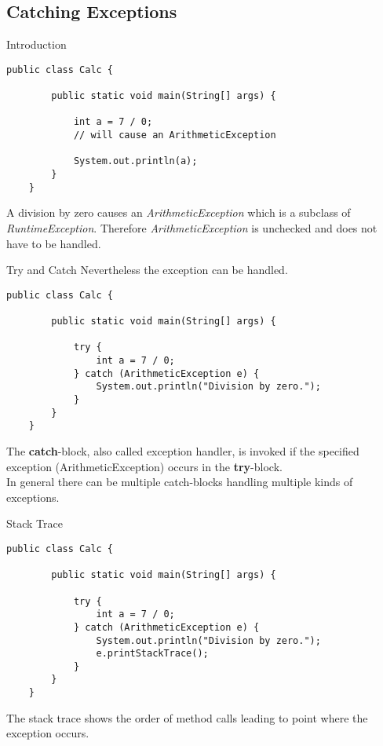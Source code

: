 \subsection{Catching Exceptions}	
\begin{frame}[fragile]{Introduction}
	\begin{lstlisting}[basicstyle=\ttfamily\scriptsize]
	public class Calc {
	
	    public static void main(String[] args) {
	
	        int a = 7 / 0;
	        // will cause an ArithmeticException
	        
	        System.out.println(a);
	    }
	}
	\end{lstlisting}
	A division by zero causes an \emph{ArithmeticException} which is a subclass of \emph{RuntimeException}. 
	Therefore \emph{ArithmeticException} is unchecked and does not have to be handled.
\end{frame}

\begin{frame}[fragile]{Try and Catch}
	Nevertheless the exception can be handled.
	\begin{lstlisting}[basicstyle=\ttfamily\scriptsize]
	public class Calc {
	
	    public static void main(String[] args) {
	
	        try {
	            int a = 7 / 0;
	        } catch (ArithmeticException e) {
	            System.out.println("Division by zero.");
	        }
	    }
	}
	\end{lstlisting}
	The \textbf{catch}-block, also called exception handler,
	is invoked if the specified exception (ArithmeticException) occurs in the \textbf{try}-block.\\
	In general there can be multiple catch-blocks handling multiple kinds of exceptions.
\end{frame}

\begin{frame}[fragile]{Stack Trace}
	\begin{lstlisting}[basicstyle=\ttfamily\scriptsize]
	public class Calc {
	
	    public static void main(String[] args) {
	
	        try {
	            int a = 7 / 0;
	        } catch (ArithmeticException e) {
	            System.out.println("Division by zero.");
	            e.printStackTrace();
	        }
	    }
	}
	\end{lstlisting}
	The stack trace shows the order of method calls leading to point where the exception occurs.
\end{frame}

